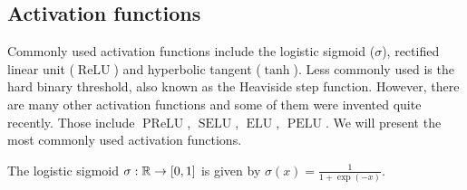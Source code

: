 \subsection{Activation functions}
\label{subsection:introduction:dl:activation-functions}
Commonly used activation functions include the logistic sigmoid ($\sigma$), rectified linear unit ($\operatorname{ReLU}$) and hyperbolic tangent ($\tanh$). Less commonly used is the hard binary threshold, also known as the Heaviside step function. However, there are many other activation functions and some of them were invented quite recently. Those include $\operatorname{PReLU}$\cite{he_2015_delving}, $\operatorname{SELU}$\cite{klambauer_2017_selfnormalizing}, $\operatorname{ELU}$\cite{clevert_2015_fast}, $\operatorname{PELU}$\cite{trottier_2018_parametric}. We will present the most commonly used activation functions.
\begin{definition}
The logistic sigmoid $\sigma : {\mathbb R} \to [0,1]$ is given by 
$\sigma(x) = \frac{1}{1 + \exp{(-x)}}$.
\end{definition}

